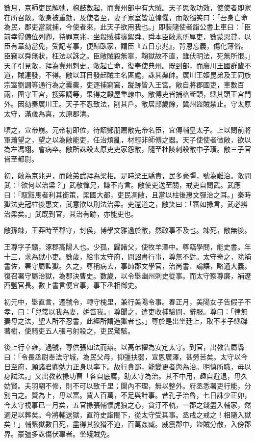 \begin{pinyinscope}
數月，京師吏民解弛，枹鼓數起，而冀州部中有大賊。天子思敞功效，使使者即家在所召敞。敞身被重劾，及使者至，妻子家室皆泣惶懼，而敞獨笑曰：「吾身亡命為民，郡吏當就捕，今使者來，此天子欲用我也。」即裝隨使者詣公書上車曰：「臣前幸得備位列卿，待罪京兆，坐殺賊捕掾絮舜。舜本臣敞素所厚吏，數蒙恩貸，以臣有章劾當免，受記考事，便歸臥家，謂臣『五日京兆』，背恩忘義，傷化薄俗。臣竊以舜無狀，枉法以誅之。臣敞賊殺無辜，鞠獄故不直，雖伏明法，死無所恨。」天子引見敞，拜為冀州刺史。敞起亡命，復奉使典州。既到部，而廣川王國群輩不道，賊連發，不得。敞以耳目發起賊主名區處，誅其渠帥。廣川王姬昆弟及王同族宗室劉調等通行為之囊橐，吏逐捕窮窘，蹤跡皆入王宮。敞自將郡國吏，車數百兩，圍守王宮，搜索調等，果得之殿屋重轑中。敞傅吏皆捕格斷頭，縣其頭王宮門外。因劾奏廣川王。天子不忍致法，削其戶。敞居部歲餘，冀州盜賊禁止。守太原太守，滿歲為真，太原郡清。

頃之，宣帝崩。元帝初即位，待詔鄭朋薦敞先帝名臣，宜傅輔皇太子。上以問前將軍蕭望之，望之以為敞能吏，任治煩亂，材輕非師傅之器。天子使使者徵敞，欲以為左馮翊。會病卒。敞所誅殺太原吏吏家怨敞，隨至杜陵刺殺敞中子璜。敞三子官皆至都尉。

初，敞為京兆尹，而敞弟武拜為梁相。是時梁王驕貴，民多豪彊，號為難治。敞問武：「欲何以治梁？」武敬憚兄，謙不肯言。敞使吏送至關，戒吏自問武。武應曰：「馭黠馬者利其銜策，梁國大都，吏民凋敝，且當以柱後惠文彈治之耳。」秦時獄法吏冠柱後惠文，武意欲以刑法治梁。吏還道之，敞笑曰：「審如掾言，武必辨治梁矣。」武既到官，其治有跡，亦能吏也。

敞孫竦，王莽時至郡守，封侯，博學文雅過於敞，然政事不及也。竦死，敞無後。

王尊字子贛，涿郡高陽人也。少孤，歸諸父，使牧羊澤中。尊竊學問，能史書。年十三，求為獄小吏。數歲，給事太守府，問詔書行事，尊無不對。太守奇之，除補書佐，署守屬監獄。久之，尊稱病去，事師郡文學官，治尚書、論語，略通大義。復召署守屬治獄，為郡決曹史。數歲，以令舉幽州刺史從事。而太守察尊廉，補遼西鹽官長。數上書言便宜事，事下丞相御史。

初元中，舉直言，遷虢令，轉守槐里，兼行美陽令事。春正月，美陽女子告假子不孝，曰：「兒常以我為妻，妒笞我。」尊聞之，遣吏收捕驗問，辭服。尊曰：「律無妻母之法，聖人所不忍書，此經所謂造獄者也。」尊於是出坐廷上，取不孝子縣磔著樹，使騎吏五人張弓射殺之，吏民驚駭。

後上行幸雍，過虢，尊供張如法而辦。以高弟擢為安定太守。到官，出教告屬縣曰：「令長丞尉奉法守城，為民父母，抑彊扶弱，宣恩廣澤，甚勞苦矣。太守以今日至府，願諸君卿勉力正身以率下。故行貪鄙，能變更者與為治。明慎所職，毋以身試法。」又出教敕掾功曹「各自底厲，助太守為治。其不中用，趣自避退，毋久妨賢。夫羽翮不修，則不可以致千里；闑內不理，無以整外。府丞悉署吏行能，分別白之。賢為上，毋以富。賈人百萬，不足與計事。昔孔子治魯，七日誅少正卯，今太守視事已一月矣，五官掾張輔懷虎狼之心，貪汙不軌，一郡之錢盡入輔家，然適足以葬矣。今將輔送獄，直符史詣閤下，從太守受其事。丞戒之戒之！相隨入獄矣！」輔繫獄數日死，盡得其狡猾不道，百萬姦臧。威震郡中，盜賊分散，入傍郡界。豪彊多誅傷伏辜者。坐殘賊免。


\end{pinyinscope}
